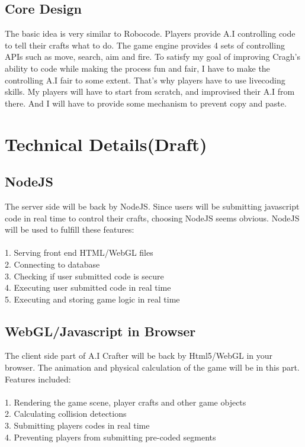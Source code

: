 \documentclass[12pt]{article}
\begin{document}
\subsection{Core Design}
The basic idea is very similar to Robocode. Players provide A.I controlling code to tell their crafts what to do. The game engine provides 4 sets of controlling APIs such as move, search, aim and fire.
To satisfy my goal of improving Cragh's ability to code while making the process fun and fair, I have to make the controlling A.I fair to some extent.
That's why players have to use livecoding skills.  My players will have to start from scratch, and improvised their A.I from there. And I will have to provide some mechanism to prevent copy and paste.

\section{Technical Details(Draft)}

\subsection{NodeJS}
The server side will be back by NodeJS. Since users will be submitting javascript code in real time to control their crafts, choosing NodeJS seems obvious. NodeJS will be used to fulfill these features:\\
\\
1. Serving front end HTML/WebGL files\\
2. Connecting to database\\
3. Checking if user submitted code is secure\\
4. Executing user submitted code in real time\\
5. Executing and storing game logic in real time\\

\subsection{WebGL/Javascript in Browser}
The client side part of A.I Crafter will be back by Html5/WebGL in your browser.
The animation and physical calculation of the game will be in this part. Features included:\\
\\
1. Rendering the game scene, player crafts and other game objects\\
2. Calculating collision detections\\
3. Submitting players codes in real time\\
4. Preventing players from submitting pre-coded segments\\
\end{document}
